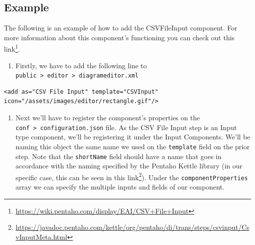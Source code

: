 \documentclass[
  11pt,
]{krantz}
\providecommand{\tightlist}{%
  \setlength{\itemsep}{0pt}\setlength{\parskip}{0pt}}
\renewcommand{\href}[2]{#2\footnote{\url{#1}}}
\begin{document}
\hypertarget{example-2}{%
\subsection{Example}\label{example-2}}

The following is an example of how to add the CSVFileInput component. For more information about this component's functioning you can check out this \href{https://wiki.pentaho.com/display/EAI/CSV+File+Input}{link}.

\begin{enumerate}
\def\labelenumi{\arabic{enumi}.}
\tightlist
\item
  Firstly, we have to add the following line to \texttt{public\ \textgreater{}\ editor\ \textgreater{}\ diagrameditor.xml}
\end{enumerate}

\begin{verbatim}
<add as="CSV File Input" template="CSVInput" icon="/assets/images/editor/rectangle.gif"/>
\end{verbatim}

\begin{enumerate}
\def\labelenumi{\arabic{enumi}.}
\setcounter{enumi}{1}
\tightlist
\item
  Next we'll have to register the component's properties on the \texttt{conf\ \textgreater{}\ configuration.json} file. As the CSV File Input step is an Input type component, we'll be registering it under the Input Components. We'll be naming this object the same name we used on the \texttt{template} field on the prior step. Note that the \texttt{shortName} field should have a name that goes in accordance with the naming specified by the Pentaho Kettle library (in our specific case, this can be seen in this \href{https://javadoc.pentaho.com/kettle/org/pentaho/di/trans/steps/csvinput/CsvInputMeta.html}{link}). Under the \texttt{componentProperties} array we can specify the multiple inputs and fields of our component.
\end{enumerate}
\end{document}
